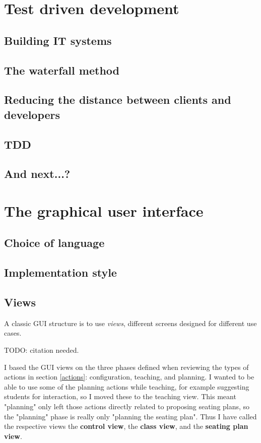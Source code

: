 \documentclass[10pt]{article}
\begin{document}
\section{Test driven development} \label{tdd}

\subsection{Building IT systems}

\subsection{The waterfall method}

\subsection{Reducing the distance between clients and developers}

\subsection{TDD}

\subsection{And next...?}




\section{The graphical user interface} \label{gui}

\subsection{Choice of language}

\subsection{Implementation style}

\subsection{Views}
A classic GUI structure is to use \emph{views}, different screens designed for different use cases.
 
TODO: citation needed.

I based the GUI views on the three phases defined when reviewing the types of actions in section \ref{actions}: configuration, teaching, and planning. I wanted to be able to use some of the planning actions while teaching, for example suggesting students for interaction, so I moved these to the teaching view. This meant "planning" only left those actions directly related to proposing seating plans, so the "planning" phase is really only "planning the seating plan". Thus I have called the respective views the \textbf{control view}, the \textbf{class view}, and the \textbf{seating plan view}.
\end{document}
